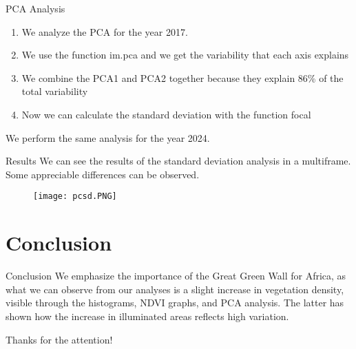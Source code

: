 \documentclass{beamer}
\begin{document}
\begin{frame}{PCA Analysis}
    \begin{enumerate}
        \item We analyze the PCA for the year 2017. 
        \item We use the function im.pca and we get the variability that each axis explains
        \item We combine the PCA1 and PCA2 together because they explain 86\% of the total variability
        \item Now we can calculate the standard deviation with the function focal
    \end{enumerate}

 
\end{frame}

\begin{frame}{}
We perform the same analysis for the year 2024.


    
\end{frame}

\begin{frame}{Results}
   We can see the results of the standard deviation analysis in a multiframe.\\ Some appreciable differences can be observed.

     

     \begin{figure}
         \centering
         \texttt{[image: pcsd.PNG]}
         \label{fig:enter-label}
     \end{figure}
\end{frame}
\section{Conclusion}
\begin{frame}{Conclusion}
  We emphasize the importance of the Great Green Wall for Africa, as what we can observe from our analyses is a slight increase in vegetation density, visible through the histograms, NDVI graphs, and PCA analysis. The latter has shown how the increase in illuminated areas reflects high variation.

  Thanks for the attention!
\end{frame}
\end{document}
